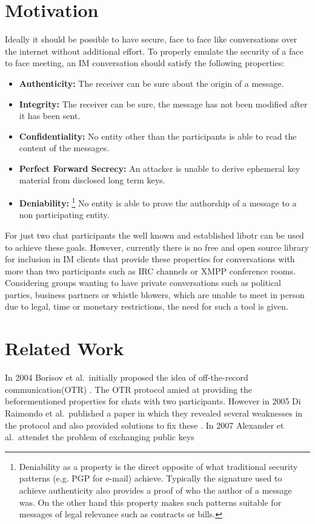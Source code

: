 \section{Motivation}
Ideally it should be possible to have secure, face to face like conversations over the internet without additional effort. To properly emulate the security of a face to face meeting, an IM conversation should satisfy the following properties:
\begin{itemize}
	\item{\textbf{Authenticity:} The receiver can be sure about the origin of a message.}
	\item{\textbf{Integrity:} The receiver can be sure, the message has not been modified after it has been sent.}
	\item{\textbf{Confidentiality:} No entity other than the participants is able to read the content of the messages.}
	\item{\textbf{Perfect Forward Secrecy:} An attacker is unable to derive ephemeral key material from disclosed long term keys.}
	\item{\textbf{Deniability:} \footnote{Deniability as a property is the direct opposite of what traditional security patterns (e.g. PGP for e-mail) achieve. Typically the signature used to achieve authenticity also provides a proof of who the author of a message was. On the other hand this property makes such patterns suitable for messages of legal relevance such as contracts or bills.} No entity is able to prove the authorship of a message to a non participating entity.}
\end{itemize}

For just two chat participants the well known and established libotr can be used
to achieve these goals. However, currently there is no free and open source
library for inclusion in IM clients that provide these properties for
conversations with more than two participants such as IRC channels or XMPP
conference rooms. Considering groups wanting to have private conversations such
as political parties, business partners or whistle blowers, which are unable to
meet in person due to legal, time or monetary restrictions, the need for such a
tool is given.

\section{Related Work}
In 2004 Borisov et al.\ initially proposed the idea of off-the-record communication(OTR) \cite{otr}. The OTR protocol amied at providing the beforementioned properties for chats with two participants. However in 2005 Di Raimondo et al.\ published a paper in which they revealed several weaknesses in the protocol and also provided solutions to fix these \cite{sec-otr}. In 2007 Alexander et al.\ attendet the problem of exchanging public keys 

